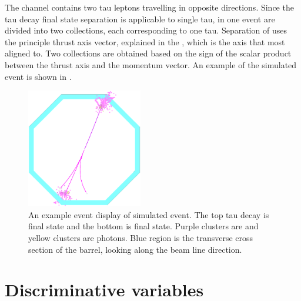 The \eeToTauTau channel contains two tau leptons travelling in opposite directions. Since the tau decay final state separation is applicable to single tau, \PFOs in one event are divided into two collections, each corresponding to one tau. Separation of \PFOs uses the principle thrust axis vector, explained in the , which is the axis that most \PFOs aligned to. Two collections are obtained based on the sign of the scalar product between the thrust axis and the \PFO momentum vector. An example of the simulated \eeToTauTau event is shown in .

\begin{figure}[tbph]
\centering
\includegraphics[width=0.45\textwidth]{tau/tau_evt_dsp2}
\caption{ An example event display of simulated \eeToTauTau event. The top tau decay is \decayRhoFinalStateShort final state and the bottom is \decayThreePionPhotonShort final state. Purple clusters are \Ppipm and yellow clusters are photons.  Blue region is the transverse cross section of the \ECAL barrel, looking along the beam line direction.}
\label{fig:tauEvtDsp}
\end{figure}



\section{Discriminative variables}

